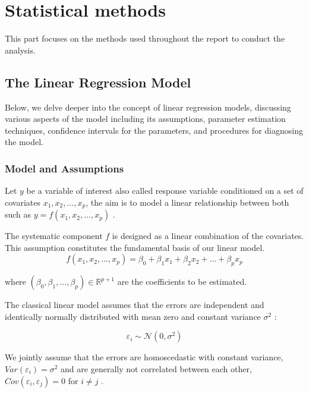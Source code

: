 \documentclass[12 pt]{scrartcl}
\numberwithin{equation}{section}
\begin{document}
\section{Statistical methods}
\label{sec:Statistical methods}

This part focuses on the methods used throughout the report to conduct the analysis.    

\subsection{The Linear Regression Model}
\label{subsec:The Linear Regression Model}
Below, we delve deeper into the concept of linear regression models, discussing various aspects of the model including its assumptions, parameter estimation techniques, confidence intervals for the parameters, and procedures for diagnosing the model.

\subsubsection*{Model and Assumptions}
\label{subsubsec:Model and Assumptions}


Let $y$ be a variable of interest also called response variable conditioned on a set of covariates $x_{1}, x_{2},..., x_{p}$,
the aim is to model a linear relationship between both such as $y = f(x_{1}, x_{2},..., x_{p})$ \citep[p.73]{regression}.  

The systematic component $f$ is designed as a linear combination of the covariates. 
This assumption constitutes the fundamental basis of our linear model. 
\begin{equation}
    f(x_{1}, x_{2},..., x_{p}) = \beta_{0} + \beta_{1}x_{1} + \beta_{2}x_{2} + ... + \beta_{p}x_{p}
\end{equation} 

where $(\beta_{0}, \beta_{1},\hdots,\beta_{p}) \in \mathbb{R}^{p+1}$ are the coefficients to be estimated.

The classical linear model assumes that the errors are independent and 
identically normally distributed with mean zero and constant variance $\sigma^2$ \citep[p.76]{regression}:

\begin{equation*}
    \varepsilon_{i} \sim \mathcal{N}(0, \sigma^2)
\end{equation*}

We jointly assume that the errors are homoscedastic with constant variance, $Var(\varepsilon_{i}) = \sigma^2$ 
and are generally not correlated between each other, 
$Cov(\varepsilon_{i}, \varepsilon_{j}) = 0$ for $i \neq j$ \cite[p.75]{regression}. 
\end{document}
